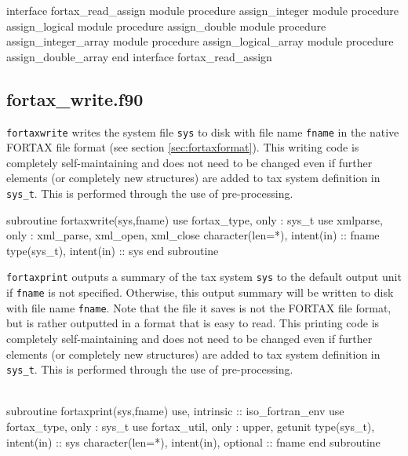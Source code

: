 \documentclass[11pt,thmsa,letter,ukenglish]{article}
\begin{document}
\begin{fortrancode}
interface fortax_read_assign
    module procedure assign_integer
    module procedure assign_logical
    module procedure assign_double
    module procedure assign_integer_array
    module procedure assign_logical_array
    module procedure assign_double_array
end interface fortax_read_assign
\end{fortrancode}

\subsection{fortax\_write.f90}

\texttt{fortaxwrite} writes the system file \texttt{sys} to disk with file name \texttt{fname} in the native FORTAX file format (see section \ref{sec:fortaxformat}). This writing code is completely self-maintaining and does not need to be changed even if further elements (or completely new structures) are added to tax system definition in \texttt{sys\_t}. This is performed through the use of pre-processing.

\begin{fortrancode}
subroutine fortaxwrite(sys,fname)
    use fortax_type,  only : sys_t
    use xmlparse,     only : xml_parse, xml_open, xml_close
    character(len=*), intent(in) :: fname
    type(sys_t),      intent(in) :: sys
end subroutine
\end{fortrancode}

\noindent\texttt{fortaxprint} outputs a summary of the tax system \texttt{sys} to the default output unit if \texttt{fname} is not specified. Otherwise, this output summary will be written to disk with file name \texttt{fname}. Note that the file it saves is not the FORTAX file format, but is rather outputted in a format that is easy to read. This printing code is completely self-maintaining and does not need to be changed even if further elements (or completely new structures) are added to tax system definition in \texttt{sys\_t}. This is performed through the use of pre-processing.\\\\

\begin{fortrancode}
subroutine fortaxprint(sys,fname)
    use, intrinsic :: iso_fortran_env
    use fortax_type,  only : sys_t
    use fortax_util,  only : upper, getunit
    type(sys_t),      intent(in) :: sys
    character(len=*), intent(in), optional :: fname
end subroutine
\end{fortrancode}
\end{document}

